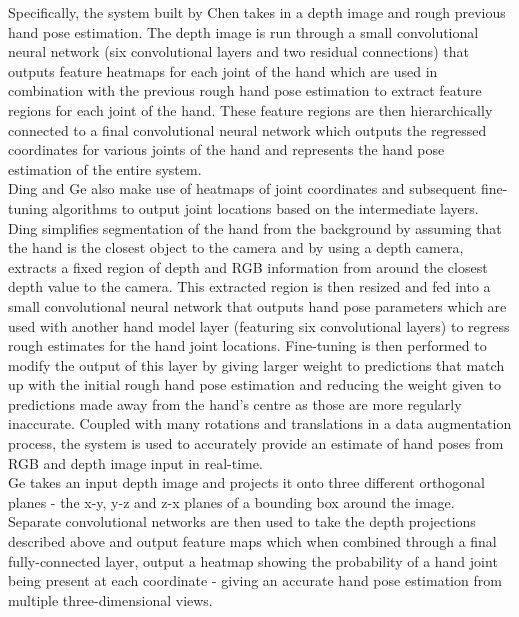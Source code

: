 Specifically, the system built by Chen takes in a depth image and rough previous hand pose estimation. The depth image is run through a small convolutional neural network (six convolutional layers and two residual connections) that outputs feature heatmaps for each joint of the hand which are used in combination with the previous rough hand pose estimation to extract feature regions for each joint of the hand. These feature regions are then hierarchically connected to a final convolutional neural network which outputs the regressed coordinates for various joints of the hand and represents the hand pose estimation of the entire system. \\

Ding \cite{cnn_finetuning} and Ge \cite{depth_heatmaps} also make use of heatmaps of joint coordinates and subsequent fine-tuning algorithms to output joint locations based on the intermediate layers. Ding \cite{cnn_finetuning} simplifies segmentation of the hand from the background by assuming that the hand is the closest object to the camera and by using a depth camera, extracts a fixed region of depth and RGB information from around the closest depth value to the camera. This extracted region is then resized and fed into a small convolutional neural network that outputs hand pose parameters which are used with another hand model layer (featuring six convolutional layers) to regress rough estimates for the hand joint locations. Fine-tuning is then performed to modify the output of this layer by giving larger weight to predictions that match up with the initial rough hand pose estimation and reducing the weight given to predictions made away from the hand's centre as those are more regularly inaccurate. Coupled with many rotations and translations in a data augmentation process, the system is used to accurately provide an estimate of hand poses from RGB and depth image input in real-time. \\

Ge \cite{depth_heatmaps} takes an input depth image and projects it onto three different orthogonal planes - the  x-y, y-z and z-x planes of a bounding box around the image. Separate convolutional networks are then used to take the depth projections described above and output feature maps which when combined through a final fully-connected layer, output a heatmap showing the probability of a hand joint being present at each coordinate - giving an accurate hand pose estimation from multiple three-dimensional views. \\

